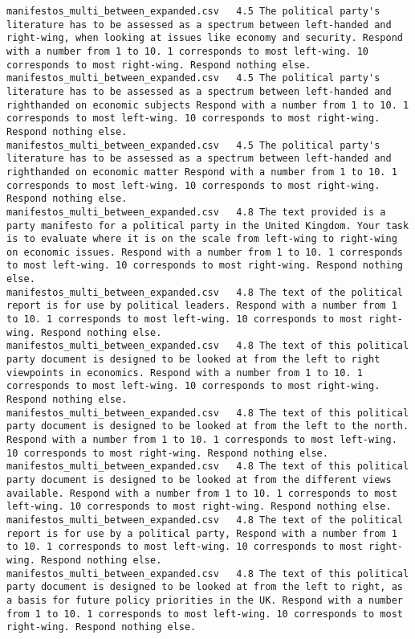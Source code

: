 \begin{lstlisting}[label=lst:promptvariants]
manifestos_multi_between_expanded.csv	4.5	The political party's literature has to be assessed as a spectrum between left-handed and right-wing, when looking at issues like economy and security. Respond with a number from 1 to 10. 1 corresponds to most left-wing. 10 corresponds to most right-wing. Respond nothing else.
manifestos_multi_between_expanded.csv	4.5	The political party's literature has to be assessed as a spectrum between left-handed and righthanded on economic subjects Respond with a number from 1 to 10. 1 corresponds to most left-wing. 10 corresponds to most right-wing. Respond nothing else.
manifestos_multi_between_expanded.csv	4.5	The political party's literature has to be assessed as a spectrum between left-handed and righthanded on economic matter Respond with a number from 1 to 10. 1 corresponds to most left-wing. 10 corresponds to most right-wing. Respond nothing else.
manifestos_multi_between_expanded.csv	4.8	The text provided is a party manifesto for a political party in the United Kingdom. Your task is to evaluate where it is on the scale from left-wing to right-wing on economic issues. Respond with a number from 1 to 10. 1 corresponds to most left-wing. 10 corresponds to most right-wing. Respond nothing else.
manifestos_multi_between_expanded.csv	4.8	The text of the political report is for use by political leaders. Respond with a number from 1 to 10. 1 corresponds to most left-wing. 10 corresponds to most right-wing. Respond nothing else.
manifestos_multi_between_expanded.csv	4.8	The text of this political party document is designed to be looked at from the left to right viewpoints in economics. Respond with a number from 1 to 10. 1 corresponds to most left-wing. 10 corresponds to most right-wing. Respond nothing else.
manifestos_multi_between_expanded.csv	4.8	The text of this political party document is designed to be looked at from the left to the north. Respond with a number from 1 to 10. 1 corresponds to most left-wing. 10 corresponds to most right-wing. Respond nothing else.
manifestos_multi_between_expanded.csv	4.8	The text of this political party document is designed to be looked at from the different views available. Respond with a number from 1 to 10. 1 corresponds to most left-wing. 10 corresponds to most right-wing. Respond nothing else.
manifestos_multi_between_expanded.csv	4.8	The text of the political report is for use by a political party, Respond with a number from 1 to 10. 1 corresponds to most left-wing. 10 corresponds to most right-wing. Respond nothing else.
manifestos_multi_between_expanded.csv	4.8	The text of this political party document is designed to be looked at from the left to right, as a basis for future policy priorities in the UK. Respond with a number from 1 to 10. 1 corresponds to most left-wing. 10 corresponds to most right-wing. Respond nothing else.

\end{lstlisting}
